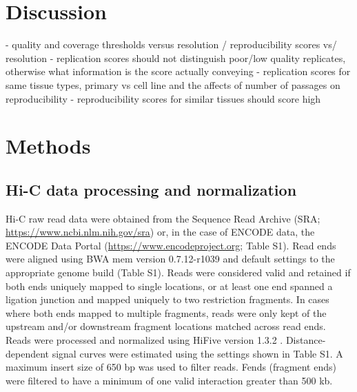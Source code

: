 

\section{Discussion}

- quality and coverage thresholds versus resolution / reproducibility scores vs/ resolution
- replication scores should not distinguish poor/low quality replicates, otherwise what information is the score actually conveying
- replication scores for same tissue types, primary vs cell line and the affects of number of passages on reproducibility
 - reproducibility scores for similar tissues should score high

\section{Methods}
\subsection{Hi-C data processing and normalization}
Hi-C raw read data were obtained from the Sequence Read Archive (SRA; \url{https://www.ncbi.nlm.nih.gov/sra}) or, in the case of ENCODE data, the ENCODE Data Portal (\url{https://www.encodeproject.org}; Table S1). Read ends were aligned using BWA mem version 0.7.12-r1039 and default settings \cite{li_sequence_2009} to the appropriate genome build (Table S1). Reads were considered valid and retained if both ends uniquely mapped to single locations, or at least one end spanned a ligation junction and mapped uniquely to two restriction fragments. In cases where both ends mapped to multiple fragments, reads were only kept of the upstream and/or downstream fragment locations matched across read ends. Reads were processed and normalized using HiFive version 1.3.2 \cite{sauria_hifive:_2015}. Distance-dependent signal curves were estimated using the settings shown in Table S1. A maximum insert size of 650 bp was used to filter reads. Fends (fragment ends) were filtered to have a minimum of one valid interaction greater than 500 kb.

